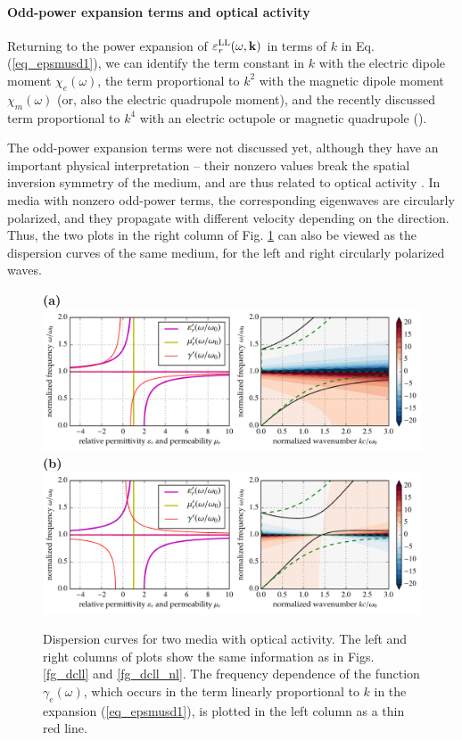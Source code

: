 \paragraph{Odd-power expansion terms and optical activity }   %
Returning to the power expansion of $\varepsilon_r^\text{LL}(\omega, {\mathbf{k}})$ in terms of $k$ in Eq. (\ref{eq_epsmusd1}), we can identify the term constant in $k$ with the electric dipole moment $\chi_e(\omega)$, the term proportional to $k^2$ with the magnetic dipole moment $\chi_m(\omega)$ (or, also the electric quadrupole moment), and the recently discussed term proportional to $k^4$ with an electric octupole or magnetic quadrupole (\cite{agranovich2006spatial, agranovich2004linear, krowne2007book}).

The odd-power expansion terms were not discussed yet, although they have an important physical interpretation -- their nonzero values break the spatial inversion symmetry of the medium, and are thus related to optical activity \cite{bungay1993equivalency}. 
In media with nonzero odd-power terms, the corresponding eigenwaves are circularly polarized, and they propagate with different velocity depending on the direction. %
Thus, the two plots in the right column of Fig. \ref{fg_dcllactivity} can also be viewed as the dispersion curves of the same medium, for the left and right circularly polarized waves.

\begin{figure}[t] \caption{Dispersion curves for two media with optical activity. The left and right columns of plots show the same information as in Figs. \ref{fg_dcll} and \ref{fg_dcll_nl}. The frequency dependence of the function $\gamma_e(\omega)$, which occurs in the term linearly proportional to $k$ in the expansion (\ref{eq_epsmusd1}), is plotted in the left column as a thin red line. } \label{fg_dcllactivity} \centering  
\textbf{(a)}\\\includegraphics[width=1\textwidth]{img/dispersion_landau_lifshitz/dispersion_ll_activep.pdf}
\textbf{(b)}\\\includegraphics[width=1\textwidth]{img/dispersion_landau_lifshitz/dispersion_ll_activen.pdf}
\end{figure}

